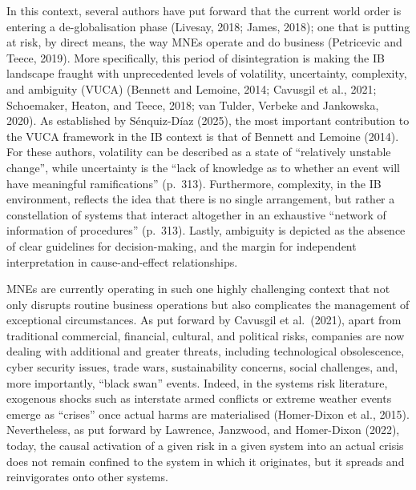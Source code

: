 \documentclass[authoryear,preprint,review,12pt]{elsarticle}
\begin{document}
In this context, several authors have put forward that the current world order is entering a de-globalisation phase (Livesay, 2018; James, 2018); one that is putting at risk, by direct means, the way MNEs operate and do business (Petricevic and Teece, 2019). More specifically, this period of disintegration is making the IB landscape fraught with unprecedented levels of volatility, uncertainty, complexity, and ambiguity (VUCA) (Bennett and Lemoine, 2014; Cavusgil et al., 2021; Schoemaker, Heaton, and Teece, 2018; van Tulder, Verbeke and Jankowska, 2020). As established by Sénquiz-Díaz (2025), the most important contribution to the VUCA framework in the IB context is that of Bennett and Lemoine (2014). For these authors, volatility can be described as a state of ``relatively unstable change'', while uncertainty is the ``lack of knowledge as to whether an event will have meaningful ramifications'' (p.\ 313). Furthermore, complexity, in the IB environment, reflects the idea that there is no single arrangement, but rather a constellation of systems that interact altogether in an exhaustive ``network of information of procedures'' (p.\ 313). Lastly, ambiguity is depicted as the absence of clear guidelines for decision-making, and the margin for independent interpretation in cause-and-effect relationships.

MNEs are currently operating in such one highly challenging context that not only disrupts routine business operations but also complicates the management of exceptional circumstances. As put forward by Cavusgil et al.\ (2021), apart from traditional commercial, financial, cultural, and political risks, companies are now dealing with additional and greater threats, including technological obsolescence, cyber security issues, trade wars, sustainability concerns, social challenges, and, more importantly, ``black swan'' events. Indeed, in the systems risk literature, exogenous shocks such as interstate armed conflicts or extreme weather events emerge as ``crises'' once actual harms are materialised (Homer-Dixon et al., 2015). Nevertheless, as put forward by Lawrence, Janzwood, and Homer-Dixon (2022), today, the causal activation of a given risk in a given system into an actual crisis does not remain confined to the system in which it originates, but it spreads and reinvigorates onto other systems.
\end{document}
